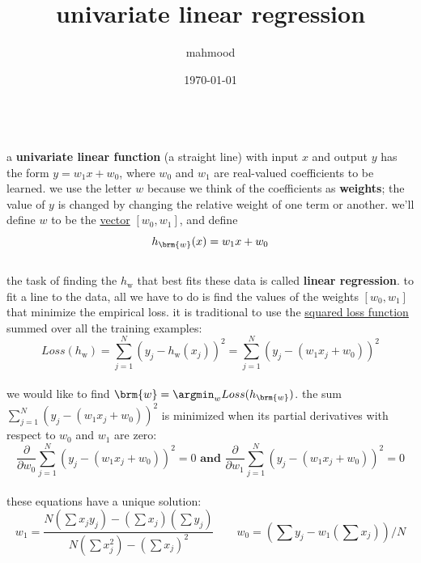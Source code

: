 \documentclass[a4paper,12pt]{article}
\author{mahmood}
\date{\today}
\title{univariate linear regression}
\begin{document}
\maketitle
\cite{aima2010}\\
a \textbf{univariate linear function} (a straight line) with input \(x\) and output \(y\) has the form \(y=w_1x+w_0\), where \(w_0\) and \(w_1\) are real-valued coefficients to be learned. we use the letter \(w\) because we think of the coefficients as \textbf{weights}; the value of \(y\) is changed by changing the relative weight of one term or another. we’ll define \(w\) to be the \href{linear_algebra2.org}{vector} \([w_0,w_1]\), and define\\
\[
h_{\brm{w}}(x)=w_1x+w_0
\]\\
the task of finding the \(h_{\boldsymbol{\mathrm{w}}}\) that best fits these data is called \textbf{linear regression}. to fit a line to the data, all we have to do is find the values of the weights \([w_0,w_1]\) that minimize the empirical loss. it is traditional to use the \href{20230420162447-squared_loss_function.org}{squared loss function} summed over all the training examples:\\
\[
Loss(h_{\boldsymbol{\mathrm{w}}}) = \sum_{j=1}^{N} \left(y_j-h_{\boldsymbol{\mathrm{w}}}(x_j)\right)^2 = \sum_{j=1}^{N} \left(y_j-(w_1x_j+w_0)\right)^2
\]\\
we would like to find \(\brm{w}=\argmin_w Loss(h_{\brm{w}})\). the sum \(\sum_{j=1}^{N} (y_j-(w_1x_j+w_0))^2\) is minimized when its partial derivatives with respect to \(w_0\) and \(w_1\) are zero:\\
\[
\frac{\partial}{\partial w_0} \sum_{j=1}^{N} (y_j-(w_1x_j+w_0))^2 = 0 \textbf{ and } \frac{\partial}{\partial w_1} \sum_{j=1}^{N} (y_j-(w_1x_j+w_0))^2=0
\]\\
these equations have a unique solution:\\
\[
w_1=\frac{N(\sum x_jy_j)-(\sum x_j)(\sum y_j)}{N(\sum x^2_j)-(\sum x_j)^2} \qquad w_0=(\sum y_j-w_1(\sum x_j))/N
\]
\end{document}
